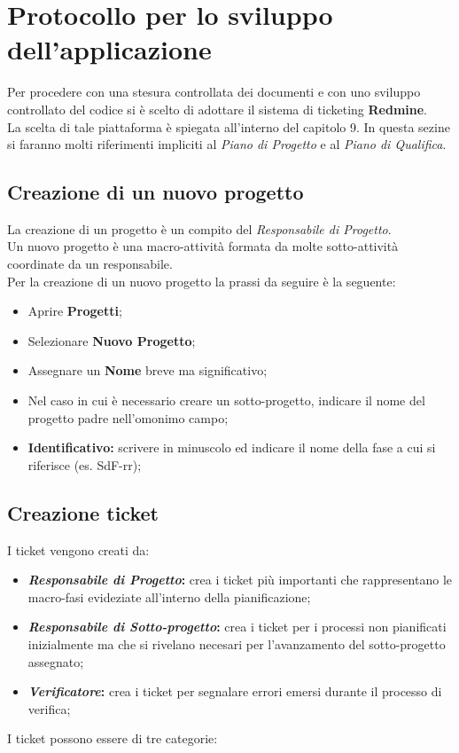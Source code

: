 \section{Protocollo per lo sviluppo dell’applicazione}
  Per procedere con una stesura controllata dei documenti e con uno sviluppo controllato del codice si è scelto di adottare
  il sistema di ticketing \textbf{Redmine}.\\
  La scelta di tale piattaforma è spiegata all'interno del capitolo 9.
  In questa sezine si faranno molti riferimenti impliciti al \emph{Piano di Progetto} e al \emph{Piano di  Qualifica}.
  \subsection{Creazione di un nuovo progetto}
    La creazione di un progetto è un compito del \emph{Responsabile di Progetto}.\\
    Un nuovo progetto è una macro-attività formata da molte sotto-attività coordinate da un responsabile.\\
    Per la creazione di un nuovo progetto la prassi da seguire è la seguente:
    \begin{itemize}
      \item Aprire \textbf{Progetti};
      \item Selezionare \textbf{Nuovo Progetto};
      \item Assegnare un \textbf{Nome} breve ma significativo;
      \item Nel caso in cui è necessario creare un sotto-progetto, indicare il nome del progetto padre nell'omonimo campo;
      \item \textbf{Identificativo: }scrivere in minuscolo ed indicare il nome della fase a cui si riferisce (es. SdF-rr);
    \end{itemize}
  \subsection{Creazione ticket}
    I ticket vengono creati da:
    \begin{itemize}
      \item \textbf{\emph{Responsabile di Progetto}: }crea i ticket più importanti che rappresentano le macro-fasi evideziate
      all'interno della pianificazione;
      \item \textbf{\emph{Responsabile di Sotto-progetto}: }crea i ticket per i processi non pianificati inizialmente ma che si rivelano necesari
      per l'avanzamento del sotto-progetto assegnato;
      \item \textbf{\emph{Verificatore}: }crea i ticket per segnalare errori emersi durante il processo di verifica;
    \end{itemize}
    I ticket possono essere di tre categorie:
    
